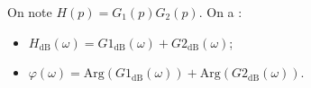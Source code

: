 \documentclass[10pt,fleqn]{article} %
\begin{document}
\begin{prop}
On note $H(p)=G_1(p)G_2(p)$. On a :
\begin{itemize}
\item $H_{\text{dB}}\left( \omega\right) =G1_{\text{dB}}\left( \omega\right)+G2_{\text{dB}}\left( \omega\right)$;
\item $\varphi\left( \omega\right)  =\text{Arg}\left(G1_{\text{dB}}\left( \omega\right)\right)+\text{Arg}\left(G2_{\text{dB}}\left( \omega\right)\right)$.
\end{itemize}
\end{prop}
\vspace{-.8cm}
\end{document}
